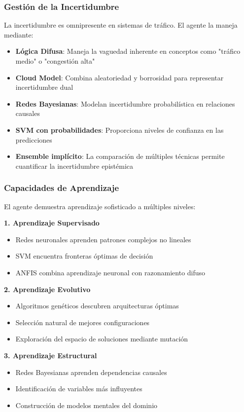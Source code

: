 \documentclass{svproc} %
\begin{document}
\subsubsection{Gestión de la Incertidumbre}
La incertidumbre es omnipresente en sistemas de tráfico. El agente la maneja mediante:

\begin{itemize}
    \item \textbf{Lógica Difusa}: Maneja la vaguedad inherente en conceptos como "tráfico medio" o "congestión alta"
    \item \textbf{Cloud Model}: Combina aleatoriedad y borrosidad para representar incertidumbre dual
    \item \textbf{Redes Bayesianas}: Modelan incertidumbre probabilística en relaciones causales
    \item \textbf{SVM con probabilidades}: Proporciona niveles de confianza en las predicciones
    \item \textbf{Ensemble implícito}: La comparación de múltiples técnicas permite cuantificar la incertidumbre epistémica
\end{itemize}

\subsubsection{Capacidades de Aprendizaje}

El agente demuestra aprendizaje sofisticado a múltiples niveles:

\textbf{1. Aprendizaje Supervisado}
\begin{itemize}
    \item Redes neuronales aprenden patrones complejos no lineales
    \item SVM encuentra fronteras óptimas de decisión
    \item ANFIS combina aprendizaje neuronal con razonamiento difuso
\end{itemize}

\textbf{2. Aprendizaje Evolutivo}
\begin{itemize}
    \item Algoritmos genéticos descubren arquitecturas óptimas
    \item Selección natural de mejores configuraciones
    \item Exploración del espacio de soluciones mediante mutación
\end{itemize}

\textbf{3. Aprendizaje Estructural}
\begin{itemize}
    \item Redes Bayesianas aprenden dependencias causales
    \item Identificación de variables más influyentes
    \item Construcción de modelos mentales del dominio
\end{itemize}
\end{document}
